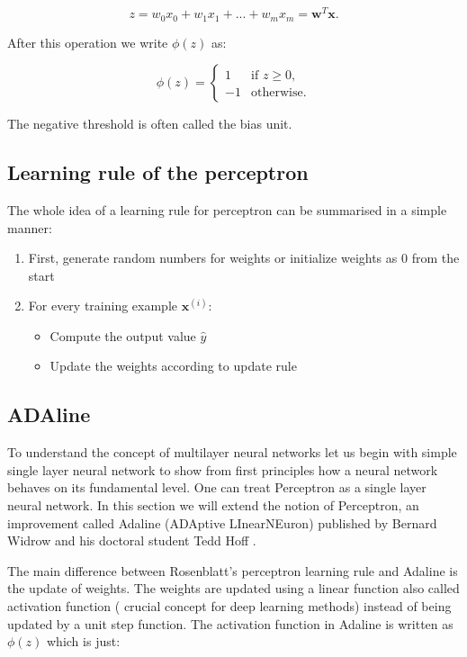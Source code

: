 \documentclass[a4paper,oneside,openright,11pt]{book}
\begin{document}
\begin{equation*}
    z = w_{0}x_{0} + w_{1}x_{1} + ... + w_{m}x_{m} = \textbf{w}^{T}\textbf{x}.
\end{equation*}

After this operation we write $\phi(z)$ as:

\begin{equation}
    \phi(z) = 
\begin{cases}
     1  & \text{if } z \geq 0, \\
-1  & \text{otherwise.}
\end{cases}
\end{equation}


The negative threshold is often called the bias unit.\cite{raschka}

\subsection{Learning rule of the perceptron}


The whole idea of a learning rule for perceptron can be summarised in a simple manner:

\begin{enumerate}
    \item First, generate random numbers for weights or initialize weights as $0$ from the start
    \item For every training example $\textbf{x}^{(i)}$:
    \begin{itemize}
        \item Compute the output value $\hat{{y}}$ 
        \item Update the weights according to update rule
    \end{itemize}
\end{enumerate}

\subsection{ADAline}

To understand the concept of multilayer neural networks let us begin with simple single layer neural network to show from first principles how a neural network behaves on its fundamental level. One can treat Perceptron as a single layer neural network. In this section we will extend the notion of Perceptron, an improvement called Adaline (ADAptive LInearNEuron) published by Bernard Widrow and his doctoral student Tedd Hoff \cite{adaline}.

The main difference between Rosenblatt's perceptron learning rule and Adaline is the update of weights. The weights are updated using a linear function also called activation function ( crucial concept for deep learning methods) instead of being updated by a unit step function. The activation function in Adaline is written as $\phi(z)$ which is just:
\end{document}
